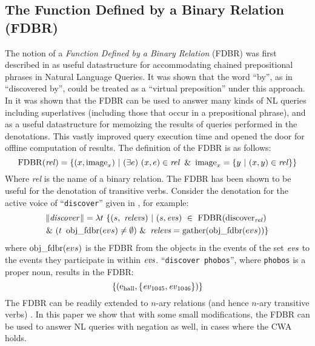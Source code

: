 \documentclass[../main.tex]{subfiles}
\begin{document}
\begin{refsection}
%
%

\subsection{The Function Defined by a Binary Relation (FDBR)}
\label{subsec:fdbr}

The notion of a \textit{Function Defined by a Binary Relation} (FDBR) was first described in \cite{peelar2016accommodating} as useful datastructure for accommodating chained prepositional phrases in Natural Language Queries.  It was shown that the word ``by'', as in ``discovered by'', could be treated as a ``virtual preposition'' under this approach. In \cite{frostpeelar2019} it was shown that the FDBR can be used to answer many kinds of NL queries including superlatives (including those that occur in a prepositional phrase), and as a useful datastructure for memoizing the results of queries performed in the denotations.  This vastly improved query execution time and opened the door for offline computation of results.
The definition of the FDBR is as follows:
\begin{equation*}
		\FDBR{\rel} = \{(x, \image_x)\ | \ (\exists e)\ (x, e) \in \rel\ \& \ \image_x = \{ y\ |\ (x, y) \in \rel \}  \}
\end{equation*}
Where \textit{rel} is the name of a binary relation.
The FDBR has been shown to be useful for the denotation of transitive verbs.  Consider the denotation for the active voice of ``\texttt{discover}'' given in \cite{peelar2020compositional}, for example:
\begin{multline*}
	\meaningof{discover} =
	\lambda t\ \{ (s,\ \opit{relevs})\ |\ (s, \evs)\ \in\ \FDBR{\relation{discover}}\ \\
	\&\ (t\ \objfdbr{evs} \neq \emptyset)\ \&\ \opit{relevs} = \gatherevs{\objfdbr{evs}} \}
\end{multline*}
where $\operatorname{obj\_fdbr}({evs})$ is the FDBR from the objects in the events of the set $\operatorname{\mathit{evs}}$ to the events they participate in within $\operatorname{\mathit{evs}}$.  ``\texttt{discover phobos}'', where \texttt{phobos} is a proper noun, results in the FDBR:
\begin{equation*}
	\{(\mathrm{e}_{\operatorname{\operatorname{hall}}}, \{ \operatorname{\mathit{ev}}_{1045}, \operatorname{\mathit{ev}}_{1046} \})\}
\end{equation*}
The FDBR can be readily extended to $n$-ary relations (and hence $n$-ary transitive verbs) \cite{peelar2020compositional}. In this paper we show that with some small modifications, the FDBR can be used to answer NL queries with negation as well, in cases where the CWA holds.
%
%


\end{refsection}
\end{document}
